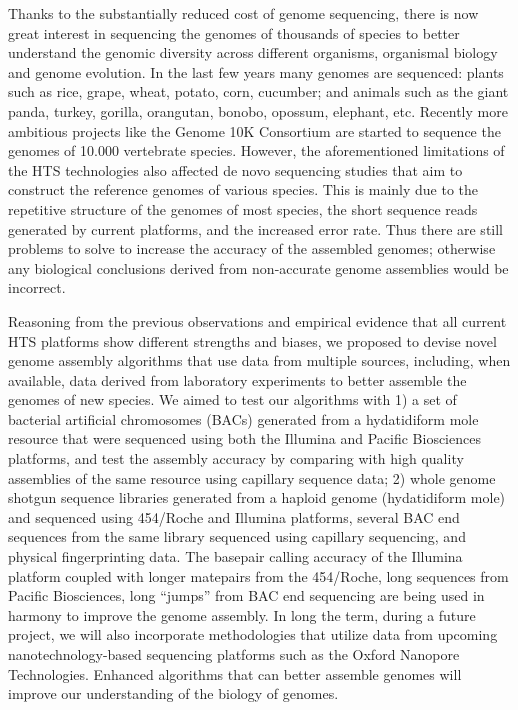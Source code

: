 \documentclass[11pt]{article}
\begin{document}
Thanks to the substantially reduced cost of genome sequencing, there is now great interest in sequencing the genomes of thousands of species to better understand the genomic diversity across different organisms, organismal biology and genome evolution. In the last few years many genomes are sequenced: plants such as rice, grape, wheat, potato, corn, cucumber; and animals such as the giant panda, turkey, gorilla, orangutan, bonobo, opossum, elephant, etc. Recently more ambitious projects like the Genome 10K Consortium are started to sequence the genomes of 10.000 vertebrate species. However, the aforementioned limitations of the HTS technologies also affected de novo sequencing studies that aim to construct the reference genomes of various species. This is mainly due to the repetitive structure of the genomes of most species, the short sequence reads generated by current platforms, and the increased error rate. Thus there are still problems to solve to increase the accuracy of the assembled genomes; otherwise any biological conclusions derived from non-accurate genome assemblies would be incorrect.

Reasoning from the previous observations and empirical evidence that all current HTS platforms show different strengths and biases, we proposed to devise novel genome assembly algorithms that use data from multiple sources, including, when available, data derived from laboratory experiments to better assemble the genomes of new species. We aimed to test our algorithms with 1) a set of bacterial artificial chromosomes (BACs) generated from a hydatidiform mole resource that were sequenced using both the Illumina and Pacific Biosciences platforms, and test the assembly accuracy by comparing with high quality assemblies of the same resource using capillary sequence data; 2) whole genome shotgun sequence libraries generated from a haploid genome (hydatidiform mole) and sequenced using 454/Roche and Illumina platforms, several BAC end sequences from the same library sequenced using capillary sequencing, and physical fingerprinting data. The basepair calling accuracy of the Illumina platform coupled with longer matepairs from the 454/Roche, long sequences from Pacific Biosciences, long ``jumps'' from BAC end sequencing are being used in harmony to improve the genome assembly. In long the term, during a future project, we will also incorporate methodologies that utilize data from upcoming nanotechnology-based sequencing platforms such as the Oxford Nanopore Technologies. Enhanced algorithms that can better assemble genomes will improve our understanding of the biology of genomes.
\end{document}
